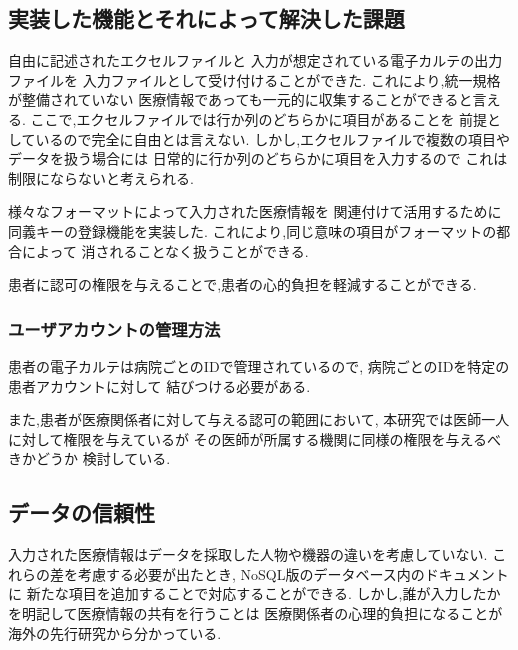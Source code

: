\subsection{実装した機能とそれによって解決した課題}
  自由に記述されたエクセルファイルと
  入力が想定されている電子カルテの出力ファイルを
  入力ファイルとして受け付けることができた.
  これにより,統一規格が整備されていない
  医療情報であっても一元的に収集することができると言える.
  ここで,エクセルファイルでは行か列のどちらかに項目があることを
  前提としているので完全に自由とは言えない.
  しかし,エクセルファイルで複数の項目やデータを扱う場合には
  日常的に行か列のどちらかに項目を入力するので
  これは制限にならないと考えられる.

  様々なフォーマットによって入力された医療情報を
  関連付けて活用するために同義キーの登録機能を実装した.
  これにより,同じ意味の項目がフォーマットの都合によって
  消されることなく扱うことができる.

  患者に認可の権限を与えることで,患者の心的負担を軽減することができる.


  \subsubsection{ユーザアカウントの管理方法}
    患者の電子カルテは病院ごとのIDで管理されているので,
    病院ごとのIDを特定の患者アカウントに対して
    結びつける必要がある.

    また,患者が医療関係者に対して与える認可の範囲において,
    本研究では医師一人に対して権限を与えているが
    その医師が所属する機関に同様の権限を与えるべきかどうか
    検討している.
  \fi

\subsection{データの信頼性}
    入力された医療情報はデータを採取した人物や機器の違いを考慮していない.
    これらの差を考慮する必要が出たとき,
    NoSQL版のデータベース内のドキュメントに
    新たな項目を追加することで対応することができる.
    しかし,誰が入力したかを明記して医療情報の共有を行うことは
    医療関係者の心理的負担になることが海外の先行研究から分かっている.
    \cite{bibi10}

